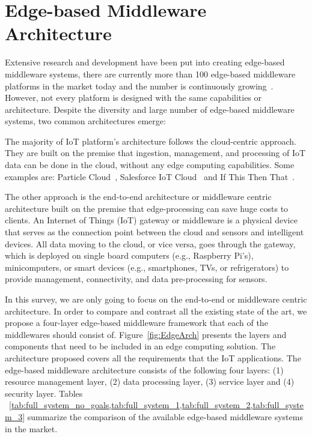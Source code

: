 \section{Edge-based Middleware Architecture}\label{sec:arch}

Extensive research and development have been put into creating edge-based middleware systems, there are currently more than 100 edge-based middleware platforms in the market today and the number is continuously growing~\cite{List}. However, not every platform is designed with the same capabilities or architecture. Despite the diversity and large number of edge-based middleware systems, two common architectures emerge:

The majority of IoT platform's architecture follows the cloud-centric approach. They are built on the premise that ingestion, management, and processing of IoT data can be done in the cloud, without any edge computing capabilities. Some examples are: Particle Cloud~\cite{Particle}, Salesforce IoT Cloud~\cite{Salesforce_IoT_Cloud} and If This Then That~\cite{IFTTT}.

The other approach is the end-to-end architecture or middleware centric architecture built on the premise that edge-processing can save huge costs to clients. An Internet of Things (IoT) gateway or middleware is a physical device that serves as the connection point between the cloud and sensors and intelligent devices. All data moving to the cloud, or vice versa, goes through the gateway, which is deployed on single board computers (e.g., Raspberry Pi's), minicomputers, or smart devices (e.g., smartphones, TVs, or refrigerators) to provide management, connectivity, and data pre-processing for sensors.

In this survey, we are only going to focus on the end-to-end or middleware centric architecture. In order to compare and contrast all the existing state of the art, we propose a four-layer edge-based middleware framework that each of the middlewares should consist of. Figure~\ref{fig:EdgeArch} presents the layers and components that need to be included in an edge computing solution. The architecture proposed covers all the requirements that the IoT applications. The edge-based middleware architecture consists of the following four layers: (1) resource management layer, (2) data processing layer, (3) service layer and (4) security layer. Tables ~\cref{tab:full_system_no_goals,tab:full_system_1,tab:full_system_2,tab:full_system_3} summarize the comparison of the available edge-based middleware systems in the market. 

